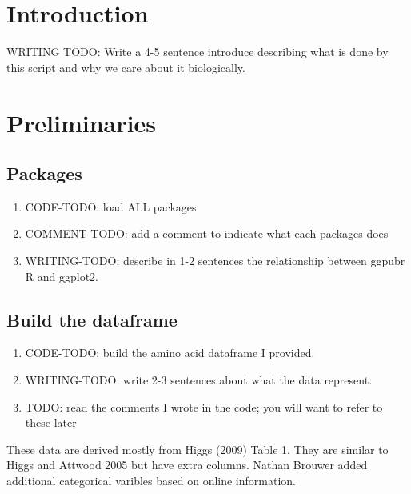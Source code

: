 \documentclass[
]{book}
\providecommand{\tightlist}{%
  \setlength{\itemsep}{0pt}\setlength{\parskip}{0pt}}
\begin{document}
\hypertarget{introduction-10}{%
\section{Introduction}\label{introduction-10}}

WRITING TODO: Write a 4-5 sentence introduce describing what is done by this script and why we care about it biologically.

\hypertarget{preliminaries-18}{%
\section{Preliminaries}\label{preliminaries-18}}

\hypertarget{packages-6}{%
\subsection{Packages}\label{packages-6}}

\begin{enumerate}
\def\labelenumi{\arabic{enumi}.}
\tightlist
\item
  CODE-TODO: load ALL packages
\item
  COMMENT-TODO: add a comment to indicate what each packages does
\item
  WRITING-TODO: describe in 1-2 sentences the relationship between ggpubr R and ggplot2.
\end{enumerate}

\hypertarget{build-the-dataframe-2}{%
\subsection{Build the dataframe}\label{build-the-dataframe-2}}

\begin{enumerate}
\def\labelenumi{\arabic{enumi}.}
\tightlist
\item
  CODE-TODO: build the amino acid dataframe I provided.
\item
  WRITING-TODO: write 2-3 sentences about what the data represent.
\item
  TODO: read the comments I wrote in the code; you will want to refer to these later
\end{enumerate}

These data are derived mostly from Higgs (2009) Table 1. They are similar to Higgs and Attwood 2005 but have extra columns. Nathan Brouwer added additional categorical varibles based on online information.
\end{document}
